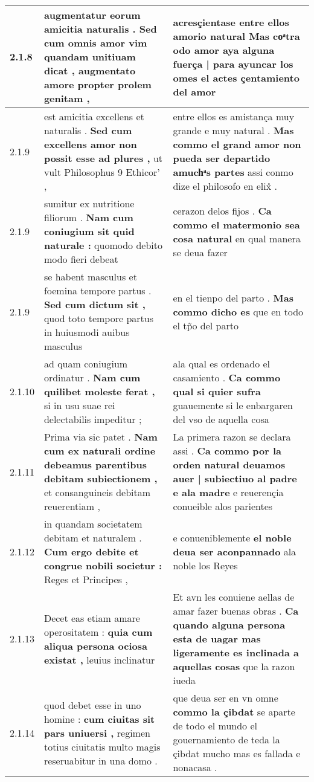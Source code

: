 \begin{tabular}{|p{1cm}|p{6.5cm}|p{6.5cm}|}
2.1.8 & augmentatur eorum amicitia naturalis . \textbf{ Sed cum omnis amor vim quandam unitiuam dicat , } augmentato amore propter prolem genitam , & acresçientase entre ellos amorio natural \textbf{ Mas coͣtra odo amor aya alguna fuerça | para ayuncar los omes } el actes çentamiento del amor \\\hline
2.1.9 & est amicitia excellens et naturalis . \textbf{ Sed cum excellens amor non possit esse ad plures , } ut vult Philosophus 9 Ethicor’ , & entre ellos es amistança muy grande e muy natural . \textbf{ Mas commo el grand amor non pueda ser departido amuchͣs partes } assi conmo dize el philosofo en elix̊ . \\\hline
2.1.9 & sumitur ex nutritione filiorum . \textbf{ Nam cum coniugium sit quid naturale : } quomodo debito modo fieri debeat & cerazon delos fijos . \textbf{ Ca commo el matermonio sea cosa natural } en qual manera se deua fazer \\\hline
2.1.9 & se habent masculus et foemina tempore partus . \textbf{ Sed cum dictum sit , } quod toto tempore partus in huiusmodi auibus masculus & en el tienpo del parto . \textbf{ Mas commo dicho es } que en todo el tp̃o del parto \\\hline
2.1.10 & ad quam coniugium ordinatur . \textbf{ Nam cum quilibet moleste ferat , } si in usu suae rei delectabilis impeditur ; & ala qual es ordenado el casamiento . \textbf{ Ca commo qual si quier sufra } guauemente si le enbargaren del vso de aquella cosa \\\hline
2.1.11 & Prima via sic patet . \textbf{ Nam cum ex naturali ordine debeamus parentibus debitam subiectionem , } et consanguineis debitam reuerentiam , & La primera razon se declara assi . \textbf{ Ca commo por la orden natural deuamos auer | subiectiuo al padre e ala madre } e reuerençia conueible alos parientes \\\hline
2.1.12 & in quandam societatem debitam et naturalem . \textbf{ Cum ergo debite et congrue nobili societur : } Reges et Principes , & e conueniblemente \textbf{ el noble deua ser aconpannado } ala noble los Reyes \\\hline
2.1.13 & Decet eas etiam amare operositatem : \textbf{ quia cum aliqua persona ociosa existat , } leuius inclinatur & Et avn les conuiene aellas de amar fazer buenas obras . \textbf{ Ca quando alguna persona esta de uagar mas ligeramente es inclinada a aquellas cosas } que la razon iueda \\\hline
2.1.14 & quod debet esse in uno homine : \textbf{ cum ciuitas sit pars uniuersi , } regimen totius ciuitatis multo magis reseruabitur in una domo . & que deua ser en vn omne \textbf{ commo la çibdat } se aparte de todo el mundo el gouernamiento de teda la çibdat mucho mas es fallada e nonacasa . \\\hline

\end{tabular}
